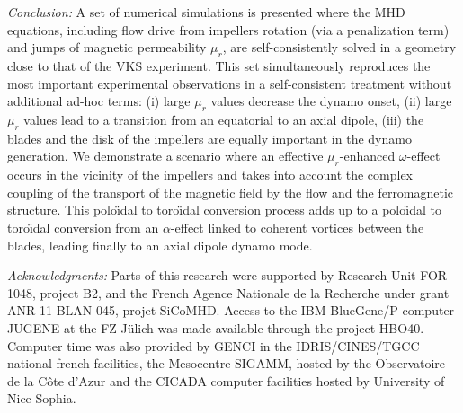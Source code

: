 \documentclass[aps,prl,twocolumn,showpacs,amsmath,amssymb]{revtex4-1}%
\begin{document}
\textit{Conclusion:}
A set of numerical simulations is presented where the MHD equations, including flow drive from impellers rotation (via a penalization term) and jumps of magnetic permeability $\mu_r$, are self-consistently solved in a geometry close to that of the VKS experiment. This set simultaneously reproduces the most important experimental observations in a self-consistent treatment without additional ad-hoc terms: (i) large $\mu_r$ values decrease the dynamo onset, (ii) large $\mu_r$ values lead to a transition from an equatorial to an axial dipole, (iii) the blades and the disk of the impellers are equally important in the dynamo generation. We demonstrate a  scenario where an effective $\mu_r$-enhanced $\omega$-effect occurs in the vicinity of the impellers and takes into account the complex coupling of the transport of the magnetic field by the flow and the ferromagnetic structure. This polo\"\i dal to toro\"\i dal conversion process adds up to a polo\"\i dal to toro\"\i dal conversion from an $\alpha$-effect linked to coherent vortices between the blades, leading finally to an axial dipole dynamo mode.

\textit{Acknowledgments:}
Parts of this research were supported by Research Unit FOR 1048,
project B2, and the French Agence Nationale de la Recherche under
grant ANR-11-BLAN-045, projet SiCoMHD.
Access to the IBM BlueGene/P computer JUGENE at the FZ J\"ulich was
made available through the project HBO40.
Computer time was also provided by GENCI in the IDRIS/CINES/TGCC national french facilities,
the Mesocentre SIGAMM, hosted by the Observatoire de la C\^ote d'Azur and 
the CICADA computer facilities hosted by University of Nice-Sophia.




\end{document}
